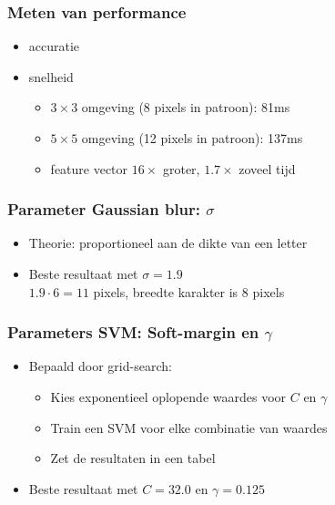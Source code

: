 \documentclass{beamer}
\begin{document}
    \begin{frame}
        \frametitle{Meten van performance}

        \begin{itemize}
            \item accuratie
            \item snelheid
            \begin{itemize}
                \item $3 \times 3$ omgeving (8 pixels in patroon): 81ms
                \item $5 \times 5$ omgeving (12 pixels in patroon): 137ms
                \item feature vector $16\times$ groter, $1.7\times$ zoveel tijd
            \end{itemize}
        \end{itemize}
    \end{frame}

    \begin{frame}
        \frametitle{Parameter Gaussian blur: $\sigma$}

        \begin{itemize}
            \item Theorie: proportioneel aan de dikte van een letter
            \item Beste resultaat met $\sigma = 1.9$ \\
            $1.9 \cdot 6 = 11$ pixels, breedte karakter is 8 pixels
        \end{itemize}
    \end{frame}

    \begin{frame}
        \frametitle{Parameters SVM: Soft-margin en $\gamma$}

        \begin{itemize}
            \item Bepaald door grid-search:
            \begin{itemize}
                \item Kies exponentieel oplopende waardes voor $C$ en $\gamma$
                \item Train een SVM voor elke combinatie van waardes
                \item Zet de resultaten in een tabel
            \end{itemize}
            \item Beste resultaat met $C = 32.0$ en $\gamma = 0.125$
        \end{itemize}
    \end{frame}
\end{document}
